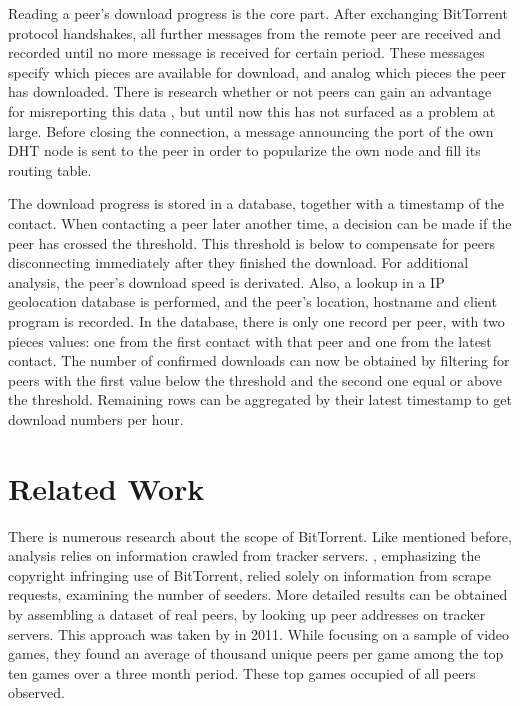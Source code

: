 \documentclass[10pt, a4paper, twoside, headsepline]{scrbook}
\renewcommand{\_}{\origunderscore\allowbreak}
\begin{document}
Reading a peer's download progress is the core part. After exchanging BitTorrent protocol handshakes, all further messages from the remote peer are received and recorded until no more message is received for certain period. These messages specify which pieces are available for download, and analog which pieces the peer has downloaded. There is research whether or not peers can gain an advantage for misreporting this data \cite{levin2008bittorrent}, but until now this has not surfaced as a problem at large. Before closing the connection, a message announcing the port of the own DHT node is sent to the peer in order to popularize the own node and fill its routing table.

The download progress is stored in a database, together with a timestamp of the contact. When contacting a peer later another time, a decision can be made if the peer has crossed the threshold. This threshold is below  to compensate for peers disconnecting immediately after they finished the download. For additional analysis, the peer's download speed is derivated. Also, a lookup in a IP geolocation database is performed, and the peer's location, hostname and client program is recorded. In the database, there is only one record per peer, with two pieces values: one from the first contact with that peer and one from the latest contact. The number of confirmed downloads can now be obtained by filtering for peers with the first value below the threshold and the second one equal or above the threshold. Remaining rows can be aggregated by their latest timestamp to get download numbers per hour.

\section{Related Work}
There is numerous research about the scope of BitTorrent. Like mentioned before, analysis relies on information crawled from tracker servers. \textcite{watters2011much}, emphasizing the copyright infringing use of BitTorrent, relied solely on information from scrape requests, examining the number of seeders. More detailed results can be obtained by assembling a dataset of real peers, by looking up peer addresses on tracker servers. This approach was taken by \textcite{drachen2011distribution} in 2011. While focusing on a sample of  video games, they found an average of  thousand unique peers per game among the top ten games over a three month period. These top  games occupied  of all peers observed.
\end{document}
